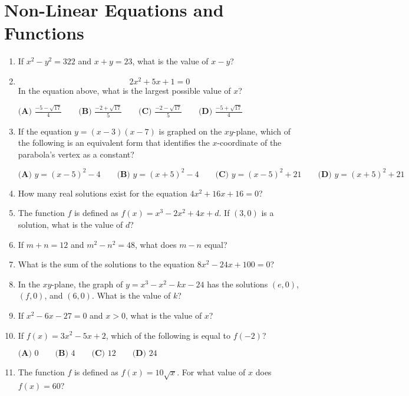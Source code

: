 \documentclass[../satmath.tex]{subfiles}
\begin{document}
\chapter{Non-Linear Equations and Functions}
\begin{enumerate}[label=\bfseries\arabic*.]

\item If $x^2-y^2=322$ and $x+y=23$, what is the value of $x-y$?

\item  
\[2x^2+5x+1=0\]
In the equation above, what is the largest possible value of $x$?

$\textbf{(A) } \frac{-5-\sqrt{17}}{4} \qquad \textbf{(B) } \frac{-2+\sqrt{17}}{5} \qquad \textbf{(C) } \frac{-2-\sqrt{17}}{5} \qquad \textbf{(D) } \frac{-5+\sqrt{17}}{4}$
 
\item If the equation $y=(x-3)(x-7)$ is graphed on the $xy$-plane, which of the following is an equivalent form that identifies the $x$-coordinate of the parabola's vertex as a constant?

$\textbf{(A) } y=(x-5)^2-4 \qquad \textbf{(B) } y=(x+5)^2-4 \qquad \textbf{(C) } y=(x-5)^2+21 \qquad \textbf{(D) } y=(x+5)^2+21$

\item How many real solutions exist for the equation $4x^2+16x+16=0$?
 
\item The function $f$ is defined as $f(x)=x^3-2x^2+4x+d$. If $(3,0)$ is a solution, what is the value of $d$?
 
\item If $m+n = 12$ and $m^2-n^2=48$, what does $m-n$ equal?
 
\item What is the sum of the solutions to the equation $8x^2-24x+100=0$?
 
\item In the $xy$-plane, the graph of $y=x^3-x^2-kx-24$ has the solutions $(e,0)$, $(f,0)$, and $(6,0)$. What is the value of $k$?
 
\item If $x^2-6x-27=0$ and $x>0$, what is the value of $x$?
 
\item If $f(x)=3x^2-5x+2$, which of the following is equal to $f(-2)$?

$\textbf{(A) } 0 \qquad \textbf{(B) } 4 \qquad \textbf{(C) } 12 \qquad \textbf{(D) } 24$
 
\item The function $f$ is defined as $f(x)=10\sqrt{x}$. For what value of $x$ does $f(x)=60$?
 

\end{enumerate}
\end{document}
